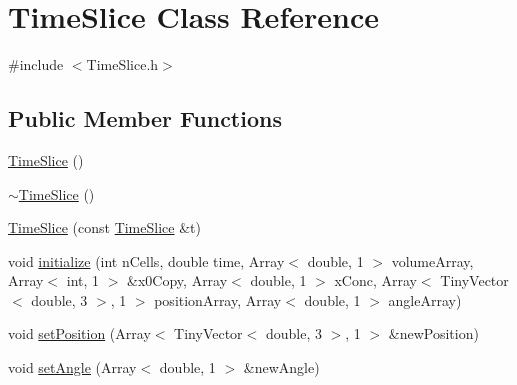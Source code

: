 \hypertarget{class_time_slice}{\section{\-Time\-Slice \-Class \-Reference}
\label{class_time_slice}
}


{\ttfamily \#include $<$\-Time\-Slice.\-h$>$}

\subsection*{\-Public \-Member \-Functions}
\begin{DoxyCompactItemize}
\item 
\hyperlink{class_time_slice_a789cab1f5cdcd4dcdc909ed89de1a4f8}{\-Time\-Slice} ()
\item 
\hyperlink{class_time_slice_a5934f3fe05382a5e076b9f26980061ab}{$\sim$\-Time\-Slice} ()
\item 
\hyperlink{class_time_slice_a71623f8af5738803fe94f8c48edc14bd}{\-Time\-Slice} (const \hyperlink{class_time_slice}{\-Time\-Slice} \&t)
\item 
void \hyperlink{class_time_slice_a6f65d18565812f9fdf502135f9b454f1}{initialize} (int n\-Cells, double time, \-Array$<$ double, 1 $>$ volume\-Array, \-Array$<$ int, 1 $>$ \&x0\-Copy, \-Array$<$ double, 1 $>$ x\-Conc, \-Array$<$ \-Tiny\-Vector$<$ double, 3 $>$, 1 $>$ position\-Array, \-Array$<$ double, 1 $>$ angle\-Array)
\item 
void \hyperlink{class_time_slice_a09c45cad277a33b7f659d2c126de44dc}{set\-Position} (\-Array$<$ \-Tiny\-Vector$<$ double, 3 $>$, 1 $>$ \&new\-Position)
\item 
void \hyperlink{class_time_slice_ab256ede2e9260f00482ec22f5d239f0e}{set\-Angle} (\-Array$<$ double, 1 $>$ \&new\-Angle)
\end{DoxyCompactItemize}
